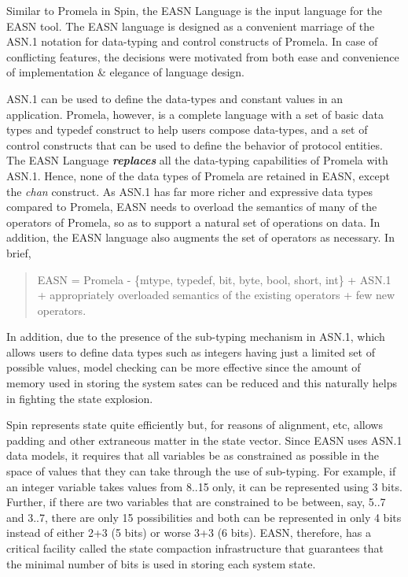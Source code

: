 \documentclass{entcs} \usepackage{entcsmacro}
\begin{document}
Similar to Promela in Spin, the EASN Language is the input language
for the EASN tool. The EASN language is designed as a convenient
marriage of the ASN.1 notation for data-typing and control constructs
of Promela. In case of conflicting features, the decisions were
motivated from both ease and convenience of implementation \& elegance
of language design.

ASN.1 can be used to define the data-types and constant values in an
application. Promela, however, is a complete language with a set of
basic data types and typedef construct to help users compose
data-types, and a set of control constructs that can be used to define
the behavior of protocol entities. The EASN Language
\textbf{\emph{replaces}} all the data-typing capabilities of Promela
with ASN.1. Hence, none of the data types of Promela are retained in
EASN, except the \emph{chan} construct.  As ASN.1 has far more
richer and expressive data types compared to Promela, EASN needs to
overload the semantics of many of the operators of Promela, so as to
support a natural set of operations on data. In addition, the EASN
language also augments the set of operators as necessary. In brief,

\begin{quote}
EASN = Promela - \{mtype, typedef, bit, byte, bool, short, int\} + 
       ASN.1 + appropriately overloaded semantics of the existing
       operators + few new operators.
\end{quote}

In addition, due to the presence of the sub-typing mechanism in ASN.1,
which allows users to define data types such as integers having just a
limited set of possible values, model checking can be more effective
since the amount of memory used in storing the system sates can be
reduced and this naturally helps in fighting the state explosion.

Spin represents state quite efficiently but, for reasons of alignment, etc,
allows padding and other extraneous matter in the state vector. Since EASN
uses ASN.1 data models, it requires that all variables be
as constrained as possible in the space of values that they can take through
the use of sub-typing. For example, if an integer variable takes values 
from 8..15 only, it can be represented using 3 bits. 
Further, if there are two variables that are constrained to be between, 
say, 5..7 and 3..7, there are only 15 possibilities and both can be 
represented in only 4 bits instead of either 2+3 (5 bits) or worse 3+3 
(6 bits). EASN, therefore, has a critical facility called the state
compaction infrastructure that guarantees that the minimal number of bits
is used in storing each system state.
\end{document}
